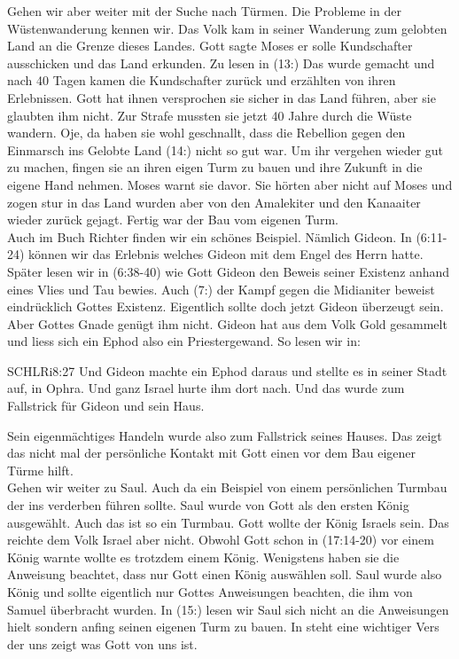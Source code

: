 \documentclass[14pt]{../../inc/mybib}
\begin{document}
    Gehen wir aber weiter mit der Suche nach Türmen. Die Probleme in der Wüstenwanderung kennen wir. Das Volk kam in seiner Wanderung zum gelobten Land an die Grenze dieses Landes. Gott sagte Moses er solle Kundschafter ausschicken und das Land erkunden. Zu lesen in (13:) Das wurde gemacht und nach 40 Tagen kamen die Kundschafter zurück und erzählten von ihren Erlebnissen. Gott hat ihnen versprochen sie sicher in das Land führen, aber sie glaubten ihm nicht. Zur Strafe mussten sie jetzt 40 Jahre durch die Wüste wandern. Oje, da haben sie wohl geschnallt, dass die Rebellion gegen den Einmarsch ins Gelobte Land (14:) nicht so gut war. Um ihr vergehen wieder gut zu machen, fingen sie an ihren eigen Turm zu bauen und ihre Zukunft in die eigene Hand nehmen. Moses warnt sie davor. Sie hörten aber nicht auf Moses und zogen stur in das Land wurden aber von den Amalekiter und den Kanaaiter wieder zurück gejagt. Fertig war der Bau vom eigenen Turm.
    \\

    Auch im Buch Richter finden wir ein schönes Beispiel. Nämlich Gideon. In (6:11-24) können wir das Erlebnis welches Gideon mit dem Engel des Herrn hatte. Später lesen wir in (6:38-40) wie Gott Gideon den Beweis seiner Existenz anhand eines Vlies und Tau bewies. Auch (7:) der Kampf gegen die Midianiter beweist eindrücklich Gottes Existenz. Eigentlich sollte doch jetzt Gideon überzeugt sein. Aber Gottes Gnade genügt ihm nicht. Gideon hat aus dem Volk Gold gesammelt und liess sich ein Ephod also ein Priestergewand. So lesen wir in:
    \begin{bibelbox}{SCHL}{Ri}{8:27}
        Und Gideon machte ein Ephod daraus und stellte es in seiner Stadt auf, in Ophra. Und ganz Israel hurte ihm dort nach. Und das wurde zum Fallstrick für Gideon und sein Haus.
    \end{bibelbox} 
    Sein eigenmächtiges Handeln wurde also zum Fallstrick seines Hauses. Das zeigt das nicht mal der persönliche Kontakt mit Gott einen vor dem Bau eigener Türme hilft.
    \\
    
    Gehen wir weiter zu Saul. Auch da ein Beispiel von einem persönlichen Turmbau der ins verderben führen sollte. Saul wurde von Gott als den ersten König ausgewählt. Auch das ist so ein Turmbau. Gott wollte der König Israels sein. Das reichte dem Volk Israel aber nicht. Obwohl Gott schon in (17:14-20) vor einem König warnte wollte es trotzdem einem König. Wenigstens haben sie die Anweisung beachtet, dass nur Gott einen König auswählen soll. Saul wurde also König und sollte eigentlich nur Gottes Anweisungen beachten, die ihm von Samuel überbracht wurden. In (15:) lesen wir Saul sich nicht an die Anweisungen hielt sondern anfing seinen eigenen Turm zu bauen. In  steht eine wichtiger Vers der uns zeigt was Gott von uns ist.
    
\end{document}
